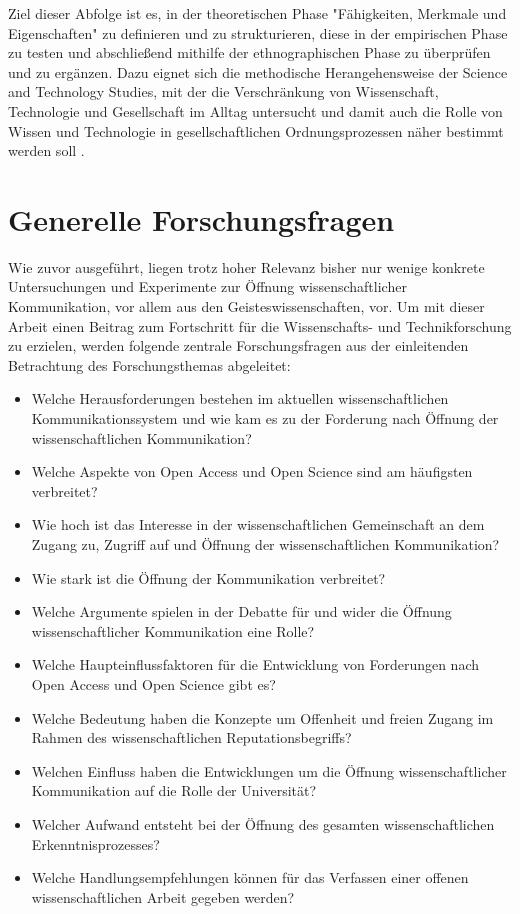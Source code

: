 Ziel dieser Abfolge ist es, in der theoretischen Phase "Fähigkeiten, Merkmale und Eigenschaften" \cite{raab_2012_fragebogen} zu definieren und zu strukturieren, diese in der empirischen Phase zu testen und abschließend mithilfe der ethnographischen Phase zu überprüfen und zu ergänzen. Dazu eignet sich die methodische Herangehensweise der Science and Technology Studies, mit der die Verschränkung von Wissenschaft, Technologie und Gesellschaft im Alltag untersucht und damit auch die Rolle von Wissen und Technologie in gesellschaftlichen Ordnungsprozessen näher bestimmt werden soll \cite{beck_2014_science}.

\section{Generelle Forschungsfragen}

Wie zuvor ausgeführt, liegen trotz hoher Relevanz bisher nur wenige konkrete Untersuchungen und Experimente zur Öffnung wissenschaftlicher Kommunikation, vor allem aus den Geisteswissenschaften, vor. Um mit dieser Arbeit einen Beitrag zum Fortschritt für die Wissenschafts- und Technikforschung zu erzielen, werden folgende zentrale Forschungsfragen aus der einleitenden Betrachtung des Forschungsthemas abgeleitet:
\begin{itemize}
\item Welche Herausforderungen bestehen im aktuellen wissenschaftlichen Kommunikationssystem und wie kam es zu der Forderung nach Öffnung der wissenschaftlichen Kommunikation?
\item Welche Aspekte von Open Access und Open Science sind am häufigsten verbreitet?
\item Wie hoch ist das Interesse in der wissenschaftlichen Gemeinschaft an dem Zugang zu, Zugriff auf und Öffnung der wissenschaftlichen Kommunikation?
\item Wie stark ist die Öffnung der Kommunikation verbreitet?
\item Welche Argumente spielen in der Debatte für und wider die Öffnung wissenschaftlicher Kommunikation eine Rolle?
\item Welche Haupteinflussfaktoren für die Entwicklung von Forderungen nach Open Access und Open Science gibt es?
\item Welche Bedeutung haben die Konzepte um Offenheit und freien Zugang im Rahmen des wissenschaftlichen Reputationsbegriffs?
\item Welchen Einfluss haben die Entwicklungen um die Öffnung wissenschaftlicher Kommunikation auf die Rolle der Universität?
\item Welcher Aufwand entsteht bei der Öffnung des gesamten wissenschaftlichen Erkenntnisprozesses?
\item Welche Handlungsempfehlungen können für das Verfassen einer offenen wissenschaftlichen Arbeit gegeben werden?
\end{itemize}

